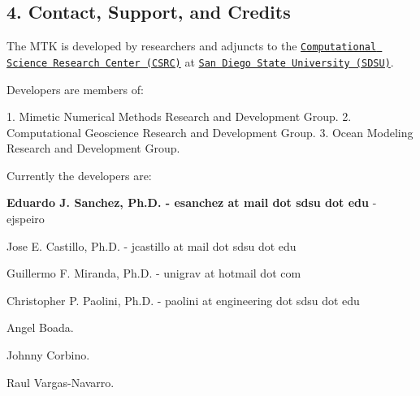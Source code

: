 \begin{DoxyPre}\subsection*{4. Contact, Support, and Credits}\end{DoxyPre}



\begin{DoxyPre}\end{DoxyPre}



\begin{DoxyPre}The MTK is developed by researchers and adjuncts to the
\href{http://www.csrc.sdsu.edu/}{\tt Computational Science Research Center (CSRC)}
at \href{http://www.sdsu.edu/}{\tt San Diego State University (SDSU)}.\end{DoxyPre}



\begin{DoxyPre}Developers are members of:\end{DoxyPre}



\begin{DoxyPre}1. Mimetic Numerical Methods Research and Development Group.
2. Computational Geoscience Research and Development Group.
3. Ocean Modeling Research and Development Group.\end{DoxyPre}



\begin{DoxyPre}Currently the developers are:\end{DoxyPre}



\begin{DoxyPre}
\begin{DoxyEnumerate}
\item {\bfseries Eduardo J. Sanchez, Ph.D. - esanchez at mail dot sdsu dot edu} - ejspeiro
\item Jose E. Castillo, Ph.D. - jcastillo at mail dot sdsu dot edu
\item Guillermo F. Miranda, Ph.D. - unigrav at hotmail dot com
\item Christopher P. Paolini, Ph.D. - paolini at engineering dot sdsu dot edu
\item Angel Boada.
\item Johnny Corbino.
\item Raul Vargas-Navarro.
\end{DoxyEnumerate}\end{DoxyPre}



